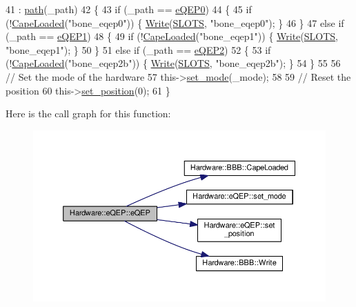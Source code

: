 \begin{DoxyCode}
41         : \hyperlink{class_hardware_1_1e_q_e_p_a82718bc8478cde37f28fc685a859525e}{path}(\_path)
42     \{
43         \textcolor{keywordflow}{if} (\_path == \hyperlink{eqep_8h_a6b7cf82bbc86508b5df1d751c202e601}{eQEP0})
44         \{
45             \textcolor{keywordflow}{if} (!\hyperlink{class_hardware_1_1_b_b_b_aaf2f732c771eac0b1ee984dbc0bca784}{CapeLoaded}(\textcolor{stringliteral}{"bone\_eqep0"})) \{ \hyperlink{class_hardware_1_1_b_b_b_a155cc06f76d82a6b690ce5ea08e7c68e}{Write}(\hyperlink{_b_b_b_8h_a3de26a5dbd2276c1486afbba5fc8de59}{SLOTS}, \textcolor{stringliteral}{"bone\_eqep0"}); \}
46         \}
47         \textcolor{keywordflow}{else} \textcolor{keywordflow}{if} (\_path == \hyperlink{eqep_8h_a490269705de1a8a0cc6d52c6cdbaa422}{eQEP1})
48         \{
49             \textcolor{keywordflow}{if} (!\hyperlink{class_hardware_1_1_b_b_b_aaf2f732c771eac0b1ee984dbc0bca784}{CapeLoaded}(\textcolor{stringliteral}{"bone\_eqep1"})) \{ \hyperlink{class_hardware_1_1_b_b_b_a155cc06f76d82a6b690ce5ea08e7c68e}{Write}(\hyperlink{_b_b_b_8h_a3de26a5dbd2276c1486afbba5fc8de59}{SLOTS}, \textcolor{stringliteral}{"bone\_eqep1"}); \}
50         \}
51         \textcolor{keywordflow}{else} \textcolor{keywordflow}{if} (\_path == \hyperlink{eqep_8h_a2dfbafc696aef9c14226ce25fb77c5f1}{eQEP2})
52         \{
53             \textcolor{keywordflow}{if} (!\hyperlink{class_hardware_1_1_b_b_b_aaf2f732c771eac0b1ee984dbc0bca784}{CapeLoaded}(\textcolor{stringliteral}{"bone\_eqep2b"})) \{ \hyperlink{class_hardware_1_1_b_b_b_a155cc06f76d82a6b690ce5ea08e7c68e}{Write}(\hyperlink{_b_b_b_8h_a3de26a5dbd2276c1486afbba5fc8de59}{SLOTS}, \textcolor{stringliteral}{"bone\_eqep2b"}); \}
54         \}
55 
56         \textcolor{comment}{// Set the mode of the hardware}
57         this->\hyperlink{class_hardware_1_1e_q_e_p_a137d1fb0b0e5772487ece48254342294}{set\_mode}(\_mode);
58 
59         \textcolor{comment}{// Reset the position}
60         this->\hyperlink{class_hardware_1_1e_q_e_p_aa55fc881377f4fc3396895de65ed9161}{set\_position}(0);
61     \}
\end{DoxyCode}


Here is the call graph for this function\+:\nopagebreak
\begin{figure}[H]
\begin{center}
\leavevmode
\includegraphics[width=350pt]{class_hardware_1_1e_q_e_p_adc9ce642c8927e217afc3600a63002e5_cgraph}
\end{center}
\end{figure}




